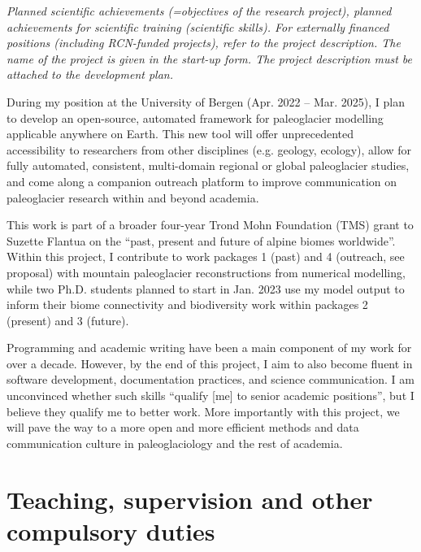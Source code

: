 \documentclass{article}
\newcommand{\guideline}[1]{{\color{color2}\itshape{#1}}}
\begin{document}
    \guideline{
        Planned scientific achievements (=objectives of the research project),
        planned achievements for scientific training (scientific skills). For
        externally financed positions (including RCN-funded projects), refer to
        the project description. The name of the project is given in the
        start-up form.  The project description must be attached to the
        development plan.}

    During my position at the University of Bergen (Apr. 2022 -- Mar. 2025), I
    plan to develop an open-source, automated framework for paleoglacier
    modelling applicable anywhere on Earth. This new tool will offer
    unprecedented accessibility to researchers from other disciplines (e.g.
    geology, ecology), allow for fully automated, consistent, multi-domain
    regional or global paleoglacier studies, and come along a companion
    outreach platform to improve communication on paleoglacier research within
    and beyond academia.

    This work is part of a broader four-year Trond Mohn Foundation (TMS) grant
    to Suzette Flantua on the ``past, present and future of alpine biomes
    worldwide''. Within this project, I contribute to work packages 1 (past) and
    4 (outreach, see proposal) with mountain paleoglacier reconstructions from
    numerical modelling, while two Ph.D. students planned to start in
    Jan. 2023 use my model output to inform their biome connectivity and
    biodiversity work within packages 2 (present) and 3 (future).

    Programming and academic writing have been a main component of my work for
    over a decade. However, by the end of this project, I aim to also become
    fluent in software development, documentation practices, and science
    communication. I am unconvinced whether such skills ``qualify [me] to
    senior academic positions'', but I believe they qualify me to better work.
    More importantly with this project, we will pave the way to a more open and
    more efficient methods and data communication culture in paleoglaciology
    and the rest of academia.


\section{Teaching, supervision and other compulsory duties}
\end{document}
